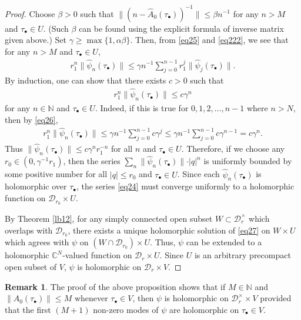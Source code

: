 \documentclass[12pt,a4paper,notitlepage]{report}
\theoremstyle{definition}
\newtheorem{rem}[df]{Remark}
\theoremstyle{plain}
\newcommand{\mc}{\mathcal}
\newcommand{\wht}{\widehat}
\newcommand{\mbb}{\mathbb}
\newcommand{\blt}{\bullet}
\newcommand{\Cbb}{\mathbb C}
\numberwithin{equation}{section}
\begin{document}
\begin{proof}
Choose $\beta>0$ such that  $\lVert (n-\wht A_0(\tau_\blt))^{-1} \lVert\leq \beta n^{-1}$ for any $n> M$ and $\tau_\blt\in U$. (Such $\beta$ can be found using the explicit formula of inverse matrix given above.) Set $\gamma\geq\max\{1,\alpha\beta\}$. Then, from \eqref{eq25} and \eqref{eq222}, we see that for any $n>M$ and $\tau_\blt\in U$,
\begin{align}
r_1^n\lVert \wht\psi_n(\tau_\blt) \lVert\leq \gamma n^{-1}\sum_{j=0}^{n-1}r_1^j\lVert \wht\psi_j(\tau_\blt) \lVert.\label{eq26}
\end{align}
By induction, one can show that there exists $c>0$ such that
\begin{align*}
r_1^n\lVert\wht\psi_n(\tau_\blt)\lVert\leq c\gamma^n 
\end{align*}
for any $n\in\mbb N$ and $\tau_\blt\in U$. Indeed, if this is true for $0,1,2,\dots,n-1$ where $n>N$, then by \eqref{eq26},
\begin{align*}
r_1^n\lVert \wht\psi_n(\tau_\blt) \lVert\leq \gamma n^{-1}\sum_{j=0}^{n-1}c\gamma^j\leq \gamma n^{-1}\sum_{j=0}^{n-1}c\gamma^{n-1}=c\gamma^n.
\end{align*}
Thus $\lVert\wht\psi_n(\tau_\blt)\lVert\leq c\gamma^nr_1^{-n}$ for all $n$ and $\tau_\blt\in U$. Therefore, if we choose any $r_0\in(0,\gamma^{-1}r_1)$, then   the series $\sum_n\lVert \wht \psi_n(\tau_\blt) \lVert \cdot|q|^n$ is uniformly bounded by some positive number for all  $|q|\leq r_0$ and $\tau_\blt\in U$. Since each $\wht\psi_n(\tau_\blt)$ is holomorphic over $\tau_\blt$, the series \eqref{eq24} must converge uniformly to a holomorphic function on $\mc D_{r_0}\times U$. 

By Theorem \ref{lb12}, for any simply connected open subset $W\subset \mc D_r^\times$ which overlaps with $\mc D_{r_0}$, there exists a unique  holomorphic solution of \eqref{eq27} on $W\times U$ which agrees with $\psi$ on $(W\cap\mc D_{r_0})\times U$. Thus, $\psi$ can be extended to a holomorphic $\Cbb^N$-valued function on $\mc D_r\times U$. Since $U$ is an arbitrary precompact open subset of $V$, $\psi$ is holomorphic on $\mc D_r\times V$.
\end{proof}

\begin{rem}\label{lb13}
The proof of the above proposition shows  that if $M\in\mbb N$ and $\lVert\wht A_0(\tau_\blt)\lVert\leq M$ whenever $\tau_\blt\in V$, then $\psi$ is holomorphic  on $\mc D_r^\times \times V$ provided that the first $(M+1)$ non-zero modes of $\psi$ are holomorphic on $\tau_\blt\in V$. 
\end{rem}
\end{document}

